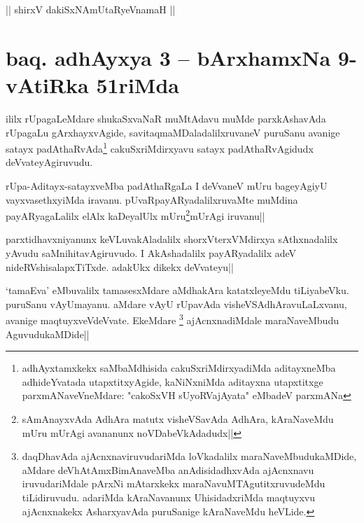 \begin{center}%
|| shirxV dakiSxNAmUtaRyeVnamaH ||
\end{center}

\section*{baq. adhAyxya 3 -- bArxhamxNa 9-vAtiRka 51riMda}

\begin{artha}
ililx rUpagaLeMdare shukaSxvaNaR muMtAdavu muMde parxkAshavAda rUpagaLu gArxhayxvAgide, savitaqmaMDaladalilxruvaneV puruSanu avanige satayx padAthaRvAda\footnote[1]{adhAyxtamxkekx saMbaMdhisida cakuSxriMdirxyadiMda aditayxneMba adhideYvatada utapxtitxyAgide, kaNiNxniMda aditayxna utapxtitxge parxmANaveVneMdare: "cakoSxVH sUyoRVajAyata" eMbadeV parxmANa} cakuSxriMdirxyavu satayx padAthaRvAgidudx deVvateyAgiruvudu.
\end{artha}


\begin{artha}
rUpa-Aditayx-satayxveMba padAthaRgaLa I deVvaneV mUru bageyAgiyU vayxvasethxyiMda iravanu. pUvaRpayARyadalilxruvaMte muMdina payARyagaLalilx elAlx kaDeyalUlx mUru\footnote[2]{sAmAnayxvAda AdhAra matutx visheVSavAda AdhAra, kAraNaveMdu mUru mUrAgi avananunx noVDabeVkAdadudx||}mUrAgi iruvanu||
\end{artha}


\begin{artha}
parxtidhavxniyanunx keVLuvakAladalilx shorxVterxVMdirxya sAthxnadalilx yAvudu saMnihitavAgiruvudo. I AkAshadalilx payARyadalilx adeV nideRVshisalapxTiTxde. adakUkx dikekx deVvateyu||
\end{artha}

\begin{artha}%
`tamaEva' eMbuvalilx tamasesxMdare aMdhakAra katatxleyeMdu tiLiyabeVku. puruSanu vAyUmayanu. aMdare vAyU rUpavAda visheVSAdhAravuLaLxvanu, avanige maqtuyxveVdeVvate. EkeMdare \footnote[1]{daqDhavAda ajAcnxnaviruvudariMda loVkadalilx maraNaveMbudukaMDide, aMdare deVhAtAmxBimAnaveMba anAdisidadhxvAda ajAcnxnavu iruvudariMdale pArxNi mAtarxkekx maraNavuMTAgutitxruvudeMdu tiLidiruvudu. adariMda kAraNavanunx UhisidadxriMda maqtuyxvu ajAcnxnakekx AsharxyavAda puruSanige kAraNaveMdu heVLide.} ajAcnxnadiMdale maraNaveMbudu AguvudukaMDide||
\end{artha}


